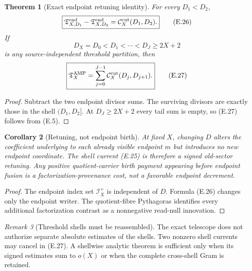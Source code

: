 \documentclass[11pt]{article}
\newtheorem{theorem}{Theorem}[section]
\newtheorem{corollary}[theorem]{Corollary}
\theoremstyle{definition}
\theoremstyle{remark}
\newtheorem{remark}[theorem]{Remark}
\begin{document}
\begin{theorem}[Exact endpoint retuning identity]
\label{thm:affend-threshold-retuning}
For every $D_1<D_2$,
\begin{equation}
 \label{eq:affend-threshold-retuning}
 \boxed{
 \mathfrak T_{X,D_1}^{\rm end}
 -\mathfrak T_{X,D_2}^{\rm end}
 =\mathcal C_X^{\rm cut}(D_1,D_2).}
 \tag{E.26}
\end{equation}
If
\[
 D_X=D_0<D_1<\cdots<D_J\ge2X+2
\]
is any source-independent threshold partition, then
\begin{equation}
 \label{eq:affend-threshold-telescope}
 \boxed{
 \mathfrak T_X^{\rm AMP}
 =\sum_{j=0}^{J-1}
   \mathcal C_X^{\rm cut}(D_j,D_{j+1}).}
 \tag{E.27}
\end{equation}
\end{theorem}

\begin{proof}
Subtract the two endpoint divisor sums.  The surviving divisors are exactly
those in the shell $(D_1,D_2]$.  At $D_J\ge2X+2$ every tail sum is empty, so
\textup{(E.27)} follows from \textup{(E.5)}.
\end{proof}

\begin{corollary}[Retuning, not endpoint birth]
\label{cor:affend-retuning-not-birth}
At fixed $X$, changing $D$ alters the coefficient underlying to each already
visible endpoint $m$ but introduces no new endpoint coordinate.  The shell
current \textup{(E.25)} is therefore a signed old-sector retuning.  Any
positive quotient-carrier birth payment appearing before endpoint fusion is a
factorization-provenance cost, not a favorable endpoint decrement.
\end{corollary}

\begin{proof}
The endpoint index set $\mathscr I_X^+$ is independent of $D$.  Formula
\textup{(E.26)} changes only the endpoint writer.  The quotient-fibre
Pythagoras identifies every additional factorization contrast as a
nonnegative read-null innovation.
\end{proof}

\begin{remark}[Threshold shells must be reassembled]
The exact telescope does not authorize separate absolute estimates of the
shells.  Two nonzero shell currents may cancel in \textup{(E.27)}.  A
shellwise analytic theorem is sufficient only when its signed estimates sum
to $o(X)$ or when the complete cross-shell Gram is retained.
\end{remark}
\end{document}
